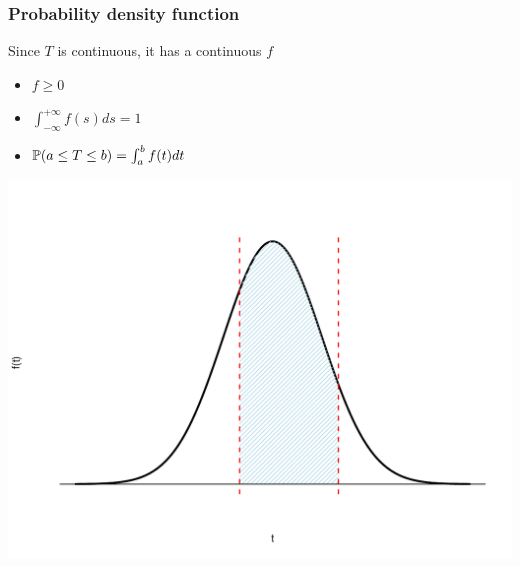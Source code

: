 \documentclass[aspectratio=169]{beamer}\usepackage[]{graphicx}\usepackage[]{xcolor}
\begin{document}
\begin{frame}\frametitle{Probability density function}
Since $T$ is continuous, it has a continuous  $f$
\begin{minipage}{0.4\textwidth}
\begin{itemize}
\item $f\geq 0$
\item $\int_{-\infty}^{+\infty}f(s)ds=1$
\item $\mathbb{P}(a\leq T\leq b)=\int_a^bf(t)dt$
\end{itemize}
\end{minipage}
\begin{minipage}{0.59\textwidth}
\includegraphics[width=\textwidth]{FIGS/L24-distrib_a_b-1.pdf}
\end{minipage}
\end{frame}
\end{document}
